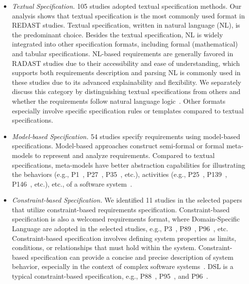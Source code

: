\begin{itemize}
    \item \textit{Textual Specification.} 105 studies adopted textual specification methods. Our analysis shows that textual specification is the most commonly used format in REDAST studies. Textual specification, written in natural language (NL), is the predominant choice. Besides the textual specification, NL is widely integrated into other specification formats, including formal (mathematical) and tabular specifications. NL-based requirements are generally favored in RADAST studies due to their accessibility and ease of understanding, which supports both requirements description and parsing NL is commonly used in these studies due to its advanced explainability and flexibility. We separately discuss this category by distinguishing textual specifications from others and whether the requirements follow natural language logic~\cite{loucopoulos1995system,sommerville2011software}. Other formats especially involve specific specification rules or templates compared to textual specifications.
    
    \item \textit{Model-based Specification.} 54 studies specify requirements using model-based specifications. Model-based approaches construct semi-formal or formal meta-models to represent and analyze requirements. Compared to textual specifications, meta-models have better abstraction capabilities for illustrating the behaviors (e.g., P1~, P27~, P35~, etc.), activities (e.g., P25~, P139~, P146~, etc.), etc., of a software system~\cite{loniewski2010systematic}. 
    
    \item \textit{Constraint-based Specification.} We identified 11 studies in the selected papers that utilize constraint-based requirements specification. Constraint-based specification is also a welcomed requirements format, where Domain-Specific Language are adopted in the selected studies, e.g., P3~, P89~, P96~, etc. Constraint-based specification involves defining system properties as limits, conditions, or relationships that must hold within the system. Constraint-based specification can provide a concise and precise description of system behavior, especially in the context of complex software systems~\cite{definition_constraint_specification_02,definition_constraint_specification_01}. DSL is a typical constraint-based specification, e.g., P88~, P95~, and P96~.
    

\end{itemize}
